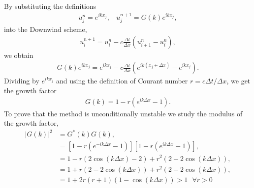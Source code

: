 \begin{questions}

\begin{solution}
By substituting the definitions
\begin{align*}
u_j^n=e^{ikx_j},~~~~u_j^{n+1}=G(k)e^{ikx_j},
\end{align*}
into the Downwind scheme,
\begin{align*}
u_i^{n+1}=u_i^{n}-c\frac{\Delta t}{\Delta x}\left(u_{i+1}^n-u_{i}^n\right),
\end{align*}
we obtain
\begin{align*}
G(k)e^{ikx_j}=e^{ikx_j}-c\frac{\Delta t}{\Delta x}\left(e^{ik(x_j+\Delta x)}-e^{ikx_j}\right).
\end{align*}
Dividing by $e^{ikx_j}$ and using the definition of Courant number $r=c\Delta t/\Delta x$, we get the growth factor
\begin{align*}
G(k)=1-r\left(e^{ik\Delta x}-1\right).
\end{align*}
To prove that the method is unconditionally unstable we study the modulus of the growth factor,
\begin{align*}
|G(k)|^2 &= G^*(k) G(k),\\
&=\left[1-r\left(e^{-ik\Delta x}-1\right)\right]\left[1-r\left(e^{ik\Delta x}-1\right)\right],\\
&=1-r\left(2\cos(k\Delta x)-2\right)+r^2\left(2-2\cos(k\Delta x)\right),\\
&=1+r\left(2-2\cos(k\Delta x)\right)+r^2\left(2-2\cos(k\Delta x)\right),\\
&=1+2r(r+1)\left(1-\cos(k\Delta x)\right)>1 ~~~\forall r>0\\
\end{align*}
\end{solution}
\end{questions}
